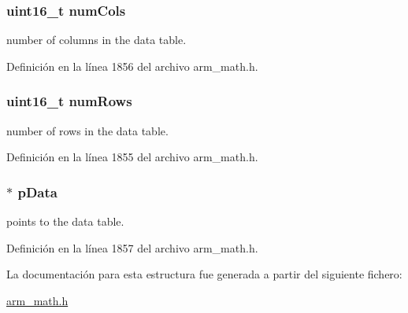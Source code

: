 \subsubsection[{\texorpdfstring{num\+Cols}{numCols}}]{\setlength{\rightskip}{0pt plus 5cm}uint16\+\_\+t num\+Cols}\hypertarget{structarm__bilinear__interp__instance__f32_a4bb5ec0d13eb4c9cf887aa8366a44117}{}\label{structarm__bilinear__interp__instance__f32_a4bb5ec0d13eb4c9cf887aa8366a44117}
number of columns in the data table. 

Definición en la línea 1856 del archivo arm\+\_\+math.\+h.

\subsubsection[{\texorpdfstring{num\+Rows}{numRows}}]{\setlength{\rightskip}{0pt plus 5cm}uint16\+\_\+t num\+Rows}\hypertarget{structarm__bilinear__interp__instance__f32_a1bcf80ccdc2acc29198f1592ae300390}{}\label{structarm__bilinear__interp__instance__f32_a1bcf80ccdc2acc29198f1592ae300390}
number of rows in the data table. 

Definición en la línea 1855 del archivo arm\+\_\+math.\+h.

\subsubsection[{\texorpdfstring{p\+Data}{pData}}]{$\ast$ p\+Data}\hypertarget{structarm__bilinear__interp__instance__f32_af5c3a2f15c98850cdcfbe6f87e5ac5df}{}\label{structarm__bilinear__interp__instance__f32_af5c3a2f15c98850cdcfbe6f87e5ac5df}
points to the data table. 

Definición en la línea 1857 del archivo arm\+\_\+math.\+h.



La documentación para esta estructura fue generada a partir del siguiente fichero\+:\begin{DoxyCompactItemize}
\item 
\hyperlink{arm__math_8h}{arm\+\_\+math.\+h}\end{DoxyCompactItemize}

